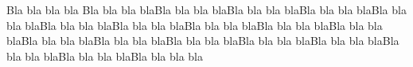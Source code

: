 \documentclass[10]{article}
\begin{document}
Bla bla bla bla Bla bla bla blaBla bla bla blaBla bla bla blaBla bla bla blaBla bla bla blaBla bla bla blaBla bla bla blaBla bla bla blaBla bla bla blaBla bla bla blaBla bla bla blaBla bla bla blaBla bla bla blaBla bla bla blaBla bla bla blaBla bla bla blaBla bla bla blaBla bla bla bla
\end{document}
